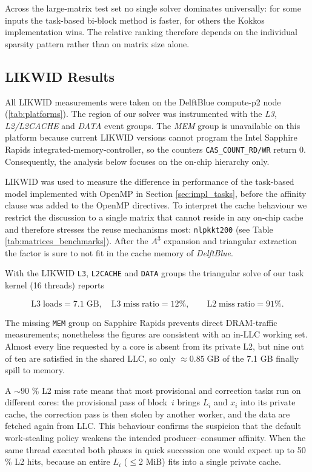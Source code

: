 Across the large-matrix test set no single solver dominates
universally: for some inputs the task-based bi-block method is faster,
for others the Kokkos implementation wins.
The relative ranking therefore depends on the individual sparsity
pattern rather than on matrix size alone.

\subsection{LIKWID Results}
\label{sec:results:cache-reuse}
All LIKWID measurements were taken on the DelftBlue compute-p2 node (\ref{tab:platforms}).
The region of our solver was instrumented with the \textit{L3}, \textit{L2/L2CACHE}
and \textit{DATA} event groups.
The \textit{MEM} group is unavailable on this
platform because current LIKWID versions cannot program the Intel Sapphire Rapids
integrated-memory-controller, so the counters \texttt{CAS\_COUNT\_RD/WR}
return 0. Consequently, the analysis below focuses on the on-chip hierarchy only.

LIKWID was used to measure the difference in performance of the task-based model implemented with OpenMP in Section \ref{sec:impl_tasks}, before the affinity clause was added to the OpenMP directives. 
To interpret the cache behaviour we restrict the discussion to a single
matrix that cannot reside in any on-chip cache and therefore
stresses the reuse mechanisms most: \texttt{nlpkkt200} (see Table \ref{tab:matrices_benchmarks}).
After the $A^3$ expansion and triangular extraction the factor
is sure to not fit in the cache memory of \textit{DelftBlue}.


With the LIKWID \texttt{L3}, \texttt{L2CACHE} and \texttt{DATA} groups
the triangular solve of our task kernel (16 threads) reports

$$
\mathrm{L3\;loads}=7.1\;\text{GB}, \quad
\mathrm{L3\;miss\;ratio}=12\%, \qquad
\mathrm{L2\;miss\;ratio}=91\%.
$$

The missing \texttt{MEM} group on Sapphire Rapids prevents
direct DRAM-traffic measurements; nonetheless the figures are
consistent with an in-LLC working set.
Almost every line requested by a core is absent from its private L2,
but nine out of ten are satisfied in the shared LLC, so only
$\approx 0.85\;\text{GB}$ of the 7.1 GB finally spill to memory.

A {\small $\sim$90 \%} L2 miss rate means that most provisional and
correction tasks run on different cores:
the provisional pass of block~$i$ brings
$L_i$ and $x_i$ into its private cache, the correction pass is then stolen by
another worker, and the data are fetched again from LLC.
This behaviour confirms the suspicion that the default
work-stealing policy weakens the intended producer–consumer affinity.
When the same thread executed both phases in quick succession one would
expect up to 50 \% L2 hits, because an entire $L_i$ ($\le$2 MiB)
fits into a single private cache.

